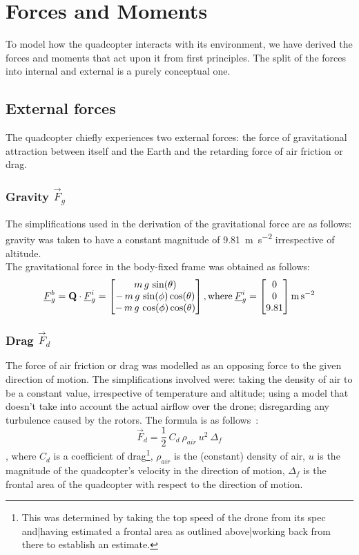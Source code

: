 
\section{Forces and Moments}


To model how the quadcopter interacts with its environment, we have derived the forces and moments that act upon it from first principles. The split of the forces into internal and external is a purely conceptual one.
\subsection{External forces}
The quadcopter chiefly experiences two external forces: the force of gravitational attraction between itself and the Earth and the retarding force of air friction or drag.
\subsubsection{Gravity $\vec{F}_g$}
The simplifications used in the derivation of the gravitational force are as follows: gravity was taken to have a constant magnitude of  \SI{9.81}{\metre\per\second\squared} irrespective of altitude.
\\
The gravitational force in the body-fixed frame was obtained as follows:
$$
\underline{F}_g^b = \textbf{Q}\cdot\underline{F}_g^i = \begin{bmatrix}
m\,g\,\sin(\theta)\\-\,m\,g\,\sin(\phi)\cos(\theta)\\-\,m\,g\,\cos(\phi)\cos(\theta)
\end{bmatrix}
\mathrm{, where }\:
\underline{F}_g^i = \begin{bmatrix}
0\\0\\9.81
\end{bmatrix}
\si{\metre\per\second\squared}
$$
\subsubsection{Drag $\vec{F}_d$}
The force of air friction or drag was modelled as an opposing force to the given direction of motion. The simplifications involved were: taking the density of air to be a constant value, irrespective of temperature and altitude; using a model that doesn't take into account the actual airflow over the drone; disregarding any turbulence caused by the rotors. The formula is as follows~:
\begin{equation}
\label{eqn:drag}
\vec{F}_d = \frac{1}{2}\:C_d\:\rho_{air}\:u^2\:\Delta_f
\end{equation}
, where $C_d$ is a coefficient of drag\footnote{This was determined by taking the top speed of the drone from its spec \cite{drone-spec} and|having estimated a frontal area as outlined above|working back from there to establish an estimate. }, $\rho_{air}$ is the (constant) density of air, $u$ is the magnitude of the quadcopter's velocity in the direction of motion, $\Delta_f$ is the frontal area of the quadcopter with respect to the direction of motion.

